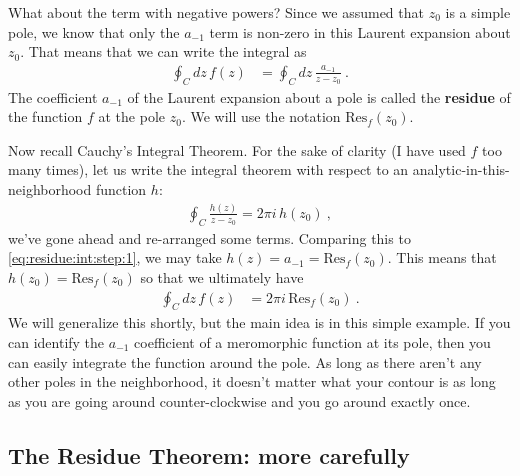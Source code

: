 What about the term with negative powers? Since we assumed that $z_0$ is a simple pole, we know that only the $a_{-1}$ term is non-zero in this Laurent expansion about $z_0$. That means that we can write the integral as
\begin{align}
	\oint_C dz\, f(z) &= 
	\oint_C dz \,
	\frac{a_{-1}}{z-z_0} 
	\ .
	\label{eq:residue:int:step:1}
\end{align}
The coefficient $a_{-1}$ of the Laurent expansion about a pole is called the \textbf{residue} of the function $f$ at the pole $z_0$. We will use the notation $\text{Res}_f(z_0)$. 


Now recall Cauchy's Integral Theorem. For the sake of clarity (I have used $f$ too many times), let us write the integral theorem with respect to an analytic-in-this-neighborhood function $h$:
\begin{align}
	\oint_C \frac{h(z)}{z-z_0} = {2\pi i} \, h(z_0) \ ,
\end{align}
we've gone ahead and re-arranged some terms. Comparing this to \eqref{eq:residue:int:step:1}, we may take $h(z) = a_{-1} = \text{Res}_f(z_0)$. This means that $h(z_0) = \text{Res}_f(z_0)$ so that we ultimately have
\begin{align}
	\oint_C dz\, f(z) &=  2\pi i  \, \text{Res}_f(z_0) \ .
\end{align}
We will generalize this shortly, but the main idea is in this simple example. If you can identify the $a_{-1}$ coefficient of a meromorphic function at its pole, then you can easily integrate the function around the pole. As long as there aren't any other poles in the neighborhood, it doesn't matter what your contour is as long as you are going around counter-clockwise and you go around exactly once.



\subsection{The Residue Theorem: more carefully}

